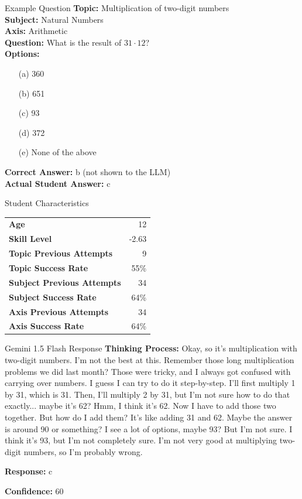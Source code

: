 \documentclass[
    a4paper, %
    10pt, %
    twoside %
]{LTJournalArticle}
\begin{document}
\begin{questionbox}{Example Question}
    \textbf{Topic:} Multiplication of two-digit numbers \\
    \textbf{Subject:} Natural Numbers \\
    \textbf{Axis:} Arithmetic \\
    
    \textbf{Question:} What is the result of $31 \cdot 12$? \\
    
    \textbf{Options:}
    \begin{itemize}
        \item[(a)] 360
        \item[(b)] 651
        \item[(c)] 93
        \item[(d)] 372
        \item[(e)] None of the above
    \end{itemize}
    
    \textbf{Correct Answer:} b (not shown to the LLM)\\
    \textbf{Actual Student Answer:} c

\end{questionbox}

\begin{studentbox}{Student Characteristics}
    \begin{tabularx}{\textwidth}{Xr}
        \textbf{Age} & 12 \\
        \textbf{Skill Level} & -2.63 \\
        \textbf{Topic Previous Attempts} & 9 \\
        \textbf{Topic Success Rate} & 55\% \\
        \textbf{Subject Previous Attempts} & 34 \\
        \textbf{Subject Success Rate} & 64\% \\
        \textbf{Axis Previous Attempts} & 34 \\
        \textbf{Axis Success Rate} & 64\% \\
    \end{tabularx}
\end{studentbox}

\begin{llmbox}{Gemini 1.5 Flash Response}
    \textbf{Thinking Process:} Okay, so it's multiplication with two-digit numbers.  I'm not the best at this.  Remember those long multiplication problems we did last month?  Those were tricky, and I always got confused with carrying over numbers. I guess I can try to do it step-by-step. I'll first multiply 1 by 31, which is 31. Then, I'll multiply 2 by 31, but I'm not sure how to do that exactly... maybe it's 62?  Hmm, I think it's 62. Now I have to add those two together.  But how do I add them? It's like adding 31 and 62. Maybe the answer is around 90 or something? I see a lot of options, maybe 93? But I'm not sure.  I think it's 93, but I'm not completely sure.  I'm not very good at multiplying two-digit numbers, so I'm probably wrong.
    
    \textbf{Response:} c
    
    \textbf{Confidence:} 60
\end{llmbox}
\end{document}
